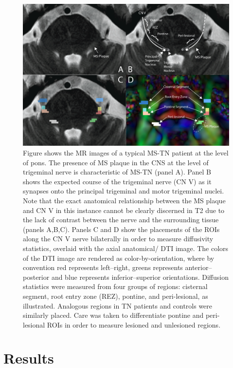 \begin{figure}[p]
\includegraphics[width=\textwidth]{figure1.png}
\caption{Figure shows the MR images of a typical MS-TN patient at the level of pons. The presence of MS plaque in the CNS at the level of trigeminal nerve is characteristic of MS-TN (panel A). Panel B shows the expected course of the trigeminal nerve (CN V) as it synapses onto the principal trigeminal and motor trigeminal nuclei. Note that the exact anatomical relationship between the MS plaque and CN V in this instance cannot be clearly discerned in T2 due to the lack of contrast between the nerve and the surrounding tissue (panels A,B,C). Panels C and D show the placements of the ROIs along the CN V nerve bilaterally in order to measure diffusivity statistics, overlaid with the axial anatomical/ DTI image. The colors of the DTI image are rendered as color-by-orientation, where by convention red represents left–right, greens represents anterior–posterior and blue represents inferior–superior orientations. Diffusion statistics were measured from four groups of regions: cisternal segment, root entry zone (REZ), pontine, and peri-lesional, as illustrated. Analogous regions in TN patients and controls were similarly placed. Care was taken to differentiate pontine and peri- lesional ROIs in order to measure lesioned and unlesioned regions.}
\centering
\label{fig:MSfigure1}
\end{figure}


\section{Results}
